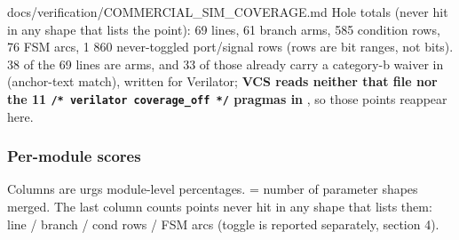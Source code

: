 \begin{relocated}{docs/verification/COMMERCIAL_SIM_COVERAGE.md}
Hole totals (never hit in any shape that lists the point): 69 lines, 61
branch arms, 585 condition rows, 76 FSM arcs, 1 860 never-toggled
port/\allowbreak{}signal rows (rows are bit ranges, not bits). 38 of the
69 lines are  arms, and 33 of those already carry a
category-b waiver in  (anchor-text
match), written for Verilator; \textbf{VCS reads neither that file nor
the 11
\texttt{/\allowbreak{}*\ verilator\ coverage\_\allowbreak{}off\ */\allowbreak{}}
pragmas in }, so those points reappear here.

\subsubsection{Per-module scores}\label{tm:flow:commercial-sim-coverage:22-per-module-scores}

Columns are urg\textquotesingle s module-level percentages.
 = number of parameter shapes merged. The last column
counts points never hit in any shape that lists them: line / branch /
cond rows / FSM arcs (toggle is reported separately, section 4).

\textbf{}

\begin{landscape}
\small\setlength{\tabcolsep}{4pt}


\end{landscape}
\end{relocated}
